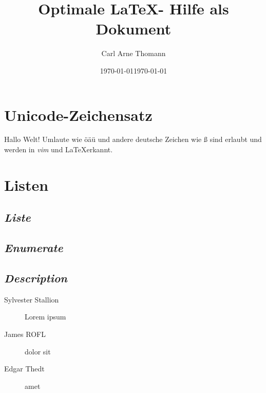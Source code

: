 \documentclass[parskip=half, titlepage=firstiscover, captions=tableheading,bibliography=totoc,]{scrartcl}
\title{Optimale \LaTeX - Hilfe als Dokument}
\author{Carl Arne Thomann}
\date{\today} %
\date{\textenglish\today} %
\begin{document}
\maketitle
\section{Unicode-Zeichensatz}
Hallo Welt!
Umlaute wie öäü und andere deutsche Zeichen wie ß sind erlaubt und werden in \emph{vim} und \LaTeX erkannt.


\section{Listen}

\subsection{\emph{Liste}}

\subsection{\emph{Enumerate}}

\subsection{\emph{Description}}
\begin{description}
	\item[Sylvester Stallion] Lorem ipsum 
	\item[James ROFL] dolor sit
	\item[Edgar Thedt] amet
\end{description}
\end{document}
